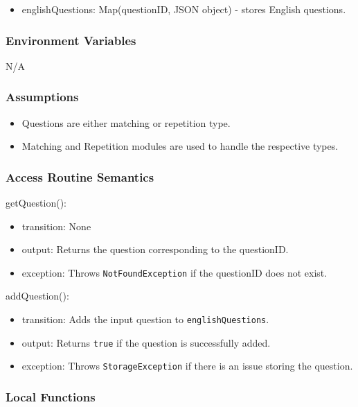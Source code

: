 \documentclass[12pt, titlepage]{article}
\begin{document}
\begin{itemize}
  \item englishQuestions: Map(questionID, JSON object) - stores English questions.
\end{itemize}

\subsubsection{Environment Variables}

N/A

\subsubsection{Assumptions}

\begin{itemize}
  \item Questions are either matching or repetition type.
  \item Matching and Repetition modules are used to handle the respective types.
\end{itemize}

\subsubsection{Access Routine Semantics}

\noindent getQuestion():
\begin{itemize}
\item transition: None
\item output: Returns the question corresponding to the questionID.
\item exception: Throws \texttt{NotFoundException} if the questionID does not exist.
\end{itemize}

\noindent addQuestion():
\begin{itemize}
\item transition: Adds the input question to \texttt{englishQuestions}.
\item output: Returns \texttt{true} if the question is successfully added.
\item exception: Throws \texttt{StorageException} if there is an issue storing the question.
\end{itemize}

\subsubsection{Local Functions}
\end{document}
